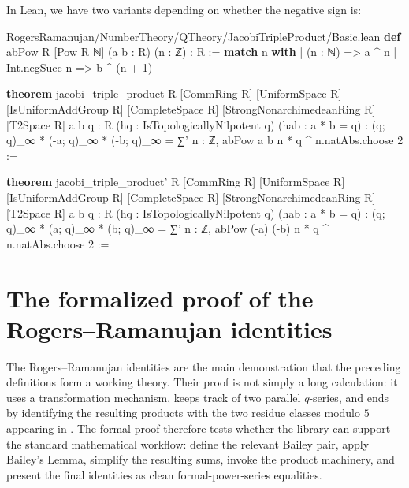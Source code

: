 \documentclass[12pt]{amsart}
\theoremstyle{definition}
\theoremstyle{remark}
\numberwithin{equation}{subsection}
\newcommand{\kw}[1]{\textcolor{keywordcolor}{\textbf{#1}}}
\newcommand{\var}[1]{\textcolor{tacticcolor}{#1}}
\newcommand{\prop}[1]{\textcolor{sortcolor}{#1}}
\newcommand{\num}[1]{\textcolor{numcolor}{#1}}
\newcommand{\imp}[1]{\textcolor{commentcolor}{\textbraceleft#1\textbraceright}}
\begin{document}
In Lean, we have two variants depending on whether the negative sign is:

\begin{code}{RogersRamanujan/NumberTheory/QTheory/JacobiTripleProduct/Basic.lean}
\kw{def} abPow \imp{R} [Pow \var{R} ℕ] (\var{a} \var{b} : \var{R}) (\var{n} : ℤ) : \var{R} := \kw{match} \var{n} \kw{with}
  | (n : ℕ) => \var{a} ^ \var{n}
  | Int.negSucc \var{n} => \var{b} ^ (\var{n} + \num{1})

\kw{theorem} jacobi_triple_product \imp{R} [CommRing \var{R}] [UniformSpace \var{R}]
  [IsUniformAddGroup \var{R}] [CompleteSpace \var{R}] [StrongNonarchimedeanRing \var{R}] [T2Space \var{R}]
  \imp{a b q : R} (\var{hq} : IsTopologicallyNilpotent \var{q}) (\var{hab} : \var{a} * \var{b} = \var{q}) :
  (\var{q}; \var{q})_∞ * (-\var{a}; \var{q})_∞ * (-\var{b}; \var{q})_∞ = ∑' \var{n} : ℤ, abPow \var{a} \var{b} \var{n} * \var{q} ^ \var{n}.\prop{natAbs}.\prop{choose} \num{2} :=

\kw{theorem} jacobi_triple_product' \imp{R} [CommRing \var{R}] [UniformSpace \var{R}]
  [IsUniformAddGroup \var{R}] [CompleteSpace \var{R}] [StrongNonarchimedeanRing \var{R}] [T2Space \var{R}]
  \imp{a b q : R} (\var{hq} : IsTopologicallyNilpotent \var{q}) (\var{hab} : \var{a} * \var{b} = \var{q}) :
  (\var{q}; \var{q})_∞ * (\var{a}; \var{q})_∞ * (\var{b}; \var{q})_∞ = ∑' \var{n} : ℤ, abPow (-\var{a}) (-\var{b}) \var{n} * \var{q} ^ \var{n}.\prop{natAbs}.\prop{choose} \num{2} :=
\end{code}



\section{The formalized proof of the Rogers--Ramanujan identities}\label{sec:RR}

The Rogers--Ramanujan identities are the main demonstration that the preceding definitions form a working theory.  Their proof is not simply a long calculation: it uses a transformation mechanism, keeps track of two parallel $q$-series, and ends by identifying the resulting products with the two residue classes modulo $5$ appearing in .  The formal proof therefore tests whether the library can support the standard mathematical workflow: define the relevant Bailey pair, apply Bailey's Lemma, simplify the resulting sums, invoke the product machinery, and present the final identities as clean formal-power-series equalities.
\end{document}
